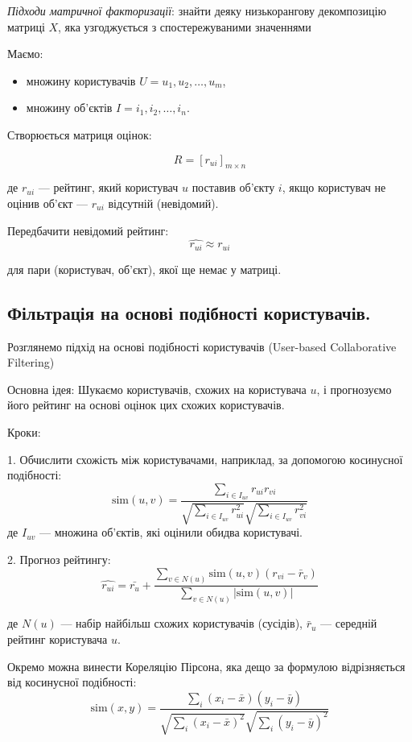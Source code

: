 \textit{Підходи матричної факторизації}: знайти деяку низькорангову декомпозицію матриці $X$, яка узгоджується з спостережуваними значеннями


Маємо:

\begin{itemize}
\item множину користувачів $ U = {u_1, u_2, \ldots, u_m} $,
\item множину об’єктів $I = {i_1, i_2, \ldots, i_n} $.
\end{itemize}

Створюється матриця оцінок:

$$
R = [r_{ui}]_{m \times n}
$$

де $r_{ui}$ — рейтинг, який користувач $ u $ поставив об’єкту $ i $, якщо користувач не оцінив об’єкт — $ r_{ui} $ відсутній (невідомий).


Передбачити невідомий рейтинг:
$$
\hat{r_{ui}} \approx r_{ui}
$$

для пари (користувач, об’єкт), якої ще немає у матриці.

\subsection{Фільтрація на основі подібності користувачів.}

Розглянемо підхід на основі подібності користувачів (User-based Collaborative Filtering)

Основна ідея: Шукаємо користувачів, схожих на користувача $u $, і прогнозуємо його рейтинг
на основі оцінок цих схожих користувачів.

Кроки:

1. Обчислити схожість між користувачами, наприклад, за допомогою косинусної подібності:
   $$
   \text{sim}(u, v) = \frac{\sum_{i \in I_{uv}} r_{ui} r_{vi}}{\sqrt{\sum_{i \in I_{uv}} r_{ui}^2} \sqrt{\sum_{i \in I_{uv}} r_{vi}^2}}
   $$
   де $ I_{uv} $ — множина об’єктів, які оцінили обидва користувачі.

2. Прогноз рейтингу:
   $$
   \hat{r_{ui}} = \bar{r_u} + \frac{\sum_{v \in N(u)} \text{sim}(u, v) (r_{vi} - \bar{r}_v)}{\sum_{v \in N(u)} |\text{sim}(u, v)|}
   $$
   
де $ N(u) $ — набір найбільш схожих користувачів (сусідів), $\bar{r}_u $ — середній рейтинг користувача $u$.



Окремо можна винести Кореляцію Пірсона, яка дещо за формулою відрізняється від косинусної подібності:
  $$
  \text{sim}(x, y) = \frac{\sum_i (x_i - \bar{x})(y_i - \bar{y})}{\sqrt{\sum_i (x_i - \bar{x})^2} \sqrt{\sum_i (y_i - \bar{y})^2}}
  $$


